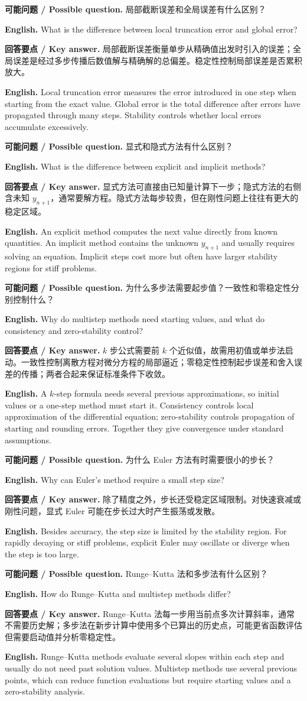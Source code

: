 \documentclass[UTF8,11pt,a4paper]{ctexart}
\newcommand{\EN}[1]{\par\noindent\textbf{English.} #1\par}
\newcommand{\ASK}[4]{\par\noindent\textbf{可能问题 / Possible question.} #1\par\EN{#2}\noindent\textbf{回答要点 / Key answer.} #3\par\EN{#4}\medskip}
\begin{document}
\ASK{局部截断误差和全局误差有什么区别？}{What is the difference between local truncation error and global error?}{局部截断误差衡量单步从精确值出发时引入的误差；全局误差是经过多步传播后数值解与精确解的总偏差。稳定性控制局部误差是否累积放大。}{Local truncation error measures the error introduced in one step when starting from the exact value. Global error is the total difference after errors have propagated through many steps. Stability controls whether local errors accumulate excessively.}

\ASK{显式和隐式方法有什么区别？}{What is the difference between explicit and implicit methods?}{显式方法可直接由已知量计算下一步；隐式方法的右侧含未知 $y_{n+1}$，通常要解方程。隐式方法每步较贵，但在刚性问题上往往有更大的稳定区域。}{An explicit method computes the next value directly from known quantities. An implicit method contains the unknown $y_{n+1}$ and usually requires solving an equation. Implicit steps cost more but often have larger stability regions for stiff problems.}

\ASK{为什么多步法需要起步值？一致性和零稳定性分别控制什么？}{Why do multistep methods need starting values, and what do consistency and zero-stability control?}{$k$ 步公式需要前 $k$ 个近似值，故需用初值或单步法启动。一致性控制离散方程对微分方程的局部逼近；零稳定性控制起步误差和舍入误差的传播；两者合起来保证标准条件下收敛。}{A $k$-step formula needs several previous approximations, so initial values or a one-step method must start it. Consistency controls local approximation of the differential equation; zero-stability controls propagation of starting and rounding errors. Together they give convergence under standard assumptions.}

\ASK{为什么 Euler 方法有时需要很小的步长？}{Why can Euler's method require a small step size?}{除了精度之外，步长还受稳定区域限制。对快速衰减或刚性问题，显式 Euler 可能在步长过大时产生振荡或发散。}{Besides accuracy, the step size is limited by the stability region. For rapidly decaying or stiff problems, explicit Euler may oscillate or diverge when the step is too large.}

\ASK{Runge--Kutta 法和多步法有什么区别？}{How do Runge--Kutta and multistep methods differ?}{Runge--Kutta 法每一步用当前点多次计算斜率，通常不需要历史解；多步法在新步计算中使用多个已算出的历史点，可能更省函数评估但需要启动值并分析零稳定性。}{Runge--Kutta methods evaluate several slopes within each step and usually do not need past solution values. Multistep methods use several previous points, which can reduce function evaluations but require starting values and a zero-stability analysis.}
\end{document}
